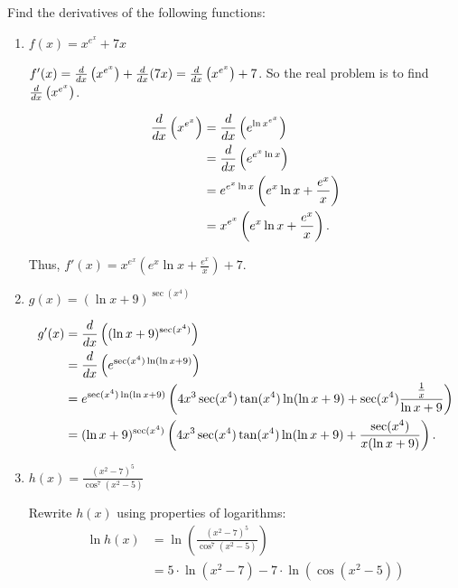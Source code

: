 \documentclass[nooutcomes]{ximera}
\begin{document}
\begin{problem}
Find the derivatives of the following functions:
	\begin{enumerate}
	
	\item  $f(x) = x^{e^x} + 7x$
		\begin{freeResponse}
		$f'(x) = \frac{d}{dx} \left(x^{e^x} \right) + \frac{d}{dx}(7x) = \frac{d}{dx} \left(x^{e^x} \right) + 7$.  So the real problem is to find $\frac{d}{dx} \left(x^{e^x} \right)$.  
		
		\begin{align*}
		\frac{d}{dx} \left( x^{e^x} \right) &= \frac{d}{dx} \left( e^{\ln x^{e^x}} \right) \\
		&= \frac{d}{dx} \left( e^{e^x \ln x} \right) \\
		&= e^{e^x \ln x} \left( e^x \ln x + \frac{e^x}{x} \right) \\
		&= x^{e^x} \left( e^x \ln x + \frac{e^x}{x} \right).
		\end{align*}
		
		Thus, $f'(x) = x^{e^x} \left( e^x \ln x + \frac{e^x}{x} \right) + 7$.  
		
		\end{freeResponse}

	\item  $g(x) = (\ln x + 9)^{\sec(x^4)}$
		\begin{freeResponse}
			\begin{align*}
			g'(x) &= \frac{d}{dx} \left( (\ln x + 9)^{\sec(x^4)} \right) \\
			&= \frac{d}{dx} \left( e^{\sec(x^4) \ln ( \ln x + 9) } \right) \\
			&= e^{\sec(x^4) \ln ( \ln x + 9)} \left( 4x^3 \sec(x^4) \tan(x^4) \ln(\ln x + 9) + \sec(x^4) \frac{\frac{1}{x}}{\ln x + 9} \right) \\
			&= (\ln x + 9)^{\sec(x^4)} \left( 4x^3 \sec(x^4) \tan(x^4) \ln(\ln x + 9) + \frac{\sec(x^4)}{x(\ln x + 9)} \right) .
			\end{align*}
		\end{freeResponse}
		
	\item  $h(x) = \frac{(x^2 - 7)^5}{\cos^7(x^2 - 5)}$
          \begin{freeResponse}
            Rewrite $h(x)$ using properties of logarithms:
            \begin{align*}
              \ln h(x) &= \ln \left( \frac{(x^2 - 7)^5}{\cos^7(x^2 - 5)}\right) \\
                       &= 5 \cdot \ln (x^2 - 7) - 7 \cdot \ln(\cos(x^2-5))
            \end{align*}



\end{freeResponse}
\end{enumerate}
\end{problem}
\end{document}
